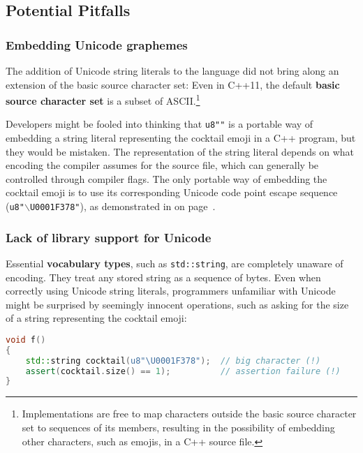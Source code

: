 \subsection[Potential Pitfalls]{Potential Pitfalls}\label{potential-pitfalls}

\subsubsection[Embedding Unicode graphemes]{Embedding Unicode graphemes}\label{embedding-unicode-graphemes}

The addition of Unicode string literals to the language did not bring
along an extension of the basic source character set: Even in C++11, the
default \textbf{basic source character set} is a subset of
ASCII.{\cprotect\footnote{Implementations are free to map characters
outside the basic source character set to sequences of its members,
resulting in the possibility of embedding other characters, such as emojis, in a C++ source file.}}

Developers might be fooled into thinking that \texttt{u8"\martini"} is a
portable way of embedding a string literal representing the cocktail
emoji in a C++ program, but they would be mistaken. The representation of the string literal depends on what
encoding the compiler assumes for the source file, which can generally
be controlled through compiler flags. The only portable way of embedding
the cocktail emoji is to use its corresponding Unicode code point escape
sequence (\texttt{u8"$\backslash$U0001F378"}), as demonstrated in
\textit{} on page~\pageref{description-unicodestring}.

\subsubsection[Lack of library support for Unicode]{Lack of library support for Unicode}\label{lack-of-library-support-for-unicode}

Essential \textbf{vocabulary types}, such as \texttt{std::string}, are
completely unaware of encoding. They treat any stored string as a
sequence of bytes. Even when correctly using Unicode string literals,
programmers unfamiliar with Unicode might be surprised by seemingly
innocent operations, such as asking for the size of a string
representing the cocktail emoji:

\begin{lstlisting}[language=C++]
void f()
{
    std::string cocktail(u8"\U0001F378");  // big character (!)
    assert(cocktail.size() == 1);          // assertion failure (!)
}
\end{lstlisting}
    

